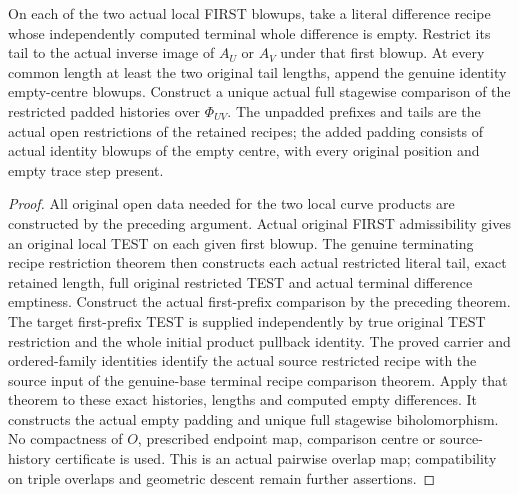 \begin{theorem}
\label{hir:sharp-actual-curve-overlap-terminal-recipes}
\leanok
On each of the two actual local FIRST blowups, take a literal difference
recipe whose independently computed terminal whole difference is empty.
Restrict its tail to the actual inverse image of $A_U$ or $A_V$ under that
first blowup. At every common length at least the two original tail lengths,
append the genuine identity empty-centre blowups. Construct a unique actual
full stagewise comparison of the restricted padded histories over
$\Phi_{UV}$. The unpadded prefixes and tails are the actual open restrictions of the
retained recipes; the added padding consists of actual identity blowups of
the empty centre, with every original position and empty trace step present.
\end{theorem}
\begin{proof}
All original open data needed for the two local curve products are constructed
by the preceding argument. Actual original FIRST admissibility gives an
original local TEST on each given first blowup. The genuine terminating
recipe restriction theorem then constructs each actual restricted literal
tail, exact retained length, full original restricted TEST and actual terminal
difference emptiness. Construct the actual first-prefix comparison by the
preceding theorem. The target first-prefix TEST is supplied independently by
true original TEST restriction and the whole initial product pullback identity.
The proved carrier and ordered-family identities identify the actual source
restricted recipe with the source input of the genuine-base terminal recipe
comparison theorem. Apply that theorem to these exact histories, lengths and
computed empty differences. It constructs the actual empty padding and unique
full stagewise biholomorphism. No compactness of $O$, prescribed endpoint map,
comparison centre or source-history certificate is used. This is an actual
pairwise overlap map; compatibility on triple overlaps and geometric descent
remain further assertions.
\end{proof}

